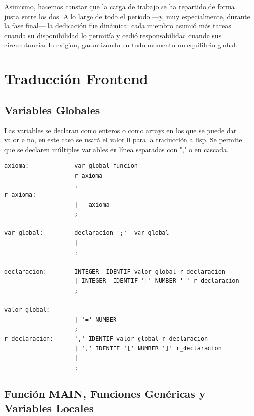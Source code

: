 \documentclass[12pt,a4paper]{article}
\begin{document}
\smallskip
\noindent Asimismo, hacemos constar que la carga de trabajo se ha repartido de forma justa entre los dos. 
A lo largo de todo el período —y, muy especialmente, durante la fase final— la dedicación fue dinámica: 
cada miembro asumió más tareas cuando su disponibilidad lo permitía y cedió responsabilidad cuando sus 
circunstancias lo exigían, garantizando en todo momento un equilibrio global.

\section{Traducción Frontend}
\subsection{Variables Globales}
\noindent Las variables se declaran como enteros o como arrays en los que se puede dar valor o no, en este caso se 
usará el valor 0 para la traducción a lisp. Se permite que se declaren múltiples variables en línea 
separadas con "," o en cascada.
\begin{lstlisting}
axioma:             var_global funcion
                    r_axioma
                    ;
r_axioma:
                    |   axioma
                    ;

var_global:         declaracion ';'  var_global
                    |
                    ;

declaracion:        INTEGER  IDENTIF valor_global r_declaracion
                    | INTEGER  IDENTIF '[' NUMBER ']' r_declaracion
                    ;

valor_global:
                    | '=' NUMBER
                    ;
r_declaracion:      ',' IDENTIF valor_global r_declaracion
                    | ',' IDENTIF '[' NUMBER ']' r_declaracion
                    |
                    ;
\end{lstlisting}
\subsection{Función MAIN, Funciones Genéricas y Variables Locales}
\end{document}
